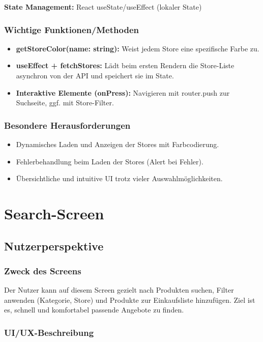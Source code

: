 \documentclass[12pt, a4paper]{report} %
\begin{document}
\noindent\textbf{State Management:} React useState/useEffect (lokaler State)

\subsubsection{Wichtige Funktionen/Methoden}

\begin{itemize}
    \item \textbf{getStoreColor(name: string):} Weist jedem Store eine spezifische Farbe zu.
    \item \textbf{useEffect + fetchStores:} Lädt beim ersten Rendern die Store-Liste asynchron von der API und speichert sie im State.
    \item \textbf{Interaktive Elemente (onPress):} Navigieren mit router.push zur Suchseite, ggf. mit Store-Filter.
\end{itemize}

\subsubsection{Besondere Herausforderungen}
\begin{itemize}
    \item Dynamisches Laden und Anzeigen der Stores mit Farbcodierung.
    \item Fehlerbehandlung beim Laden der Stores (Alert bei Fehler).
    \item Übersichtliche und intuitive UI trotz vieler Auswahlmöglichkeiten.
\end{itemize}

\section{Search-Screen}
\label{sec:search_screen}

\subsection{Nutzerperspektive}

\subsubsection{Zweck des Screens}
Der Nutzer kann auf diesem Screen gezielt nach Produkten suchen, Filter anwenden (Kategorie, Store) und Produkte zur Einkaufsliste hinzufügen. Ziel ist es, schnell und komfortabel passende Angebote zu finden.

\subsubsection{UI/UX-Beschreibung}
\end{document}
